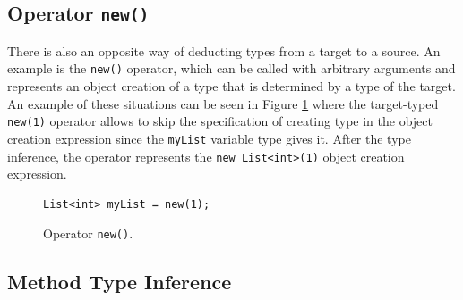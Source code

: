\subsection{Operator \texttt{new()}} \label{sect:new}

There is also an opposite way of deducting types from a target to a source.
An example is the \texttt{new()} operator, which can be called with arbitrary arguments and represents an object creation of a type that is determined by a type of the target. 
An example of these situations can be seen in Figure \ref{img08:new} where the target-typed \texttt{new(1)} operator allows to skip the specification of creating type in the object creation expression since the \texttt{myList} variable type gives it. After the type inference, the operator represents the \texttt{new List<int>(1)} object creation expression.
\begin{figure}[h]
\begin{lstlisting}[style=csharp]
List<int> myList = new(1);
\end{lstlisting}
\caption{Operator \texttt{new()}.}
\label{img08:new}
\end{figure}

\subsection{Method Type Inference} \label{sect05:mti}

